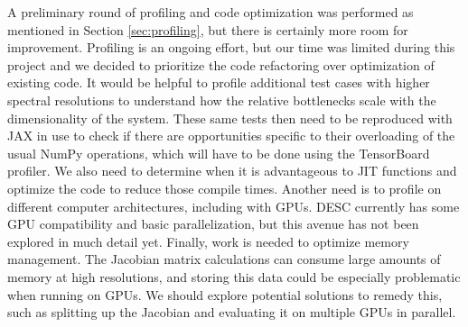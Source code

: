 \documentclass{article}
\begin{document}
A preliminary round of profiling and code optimization was performed as mentioned in Section \ref{sec:profiling}, but there is certainly more room for improvement.
Profiling is an ongoing effort, but our time was limited during this project and we decided to prioritize the code refactoring over optimization of existing code.
It would be helpful to profile additional test cases with higher spectral resolutions to understand how the relative bottlenecks scale with the dimensionality of the system.
These same tests then need to be reproduced with JAX in use to check if there are opportunities specific to their overloading of the usual NumPy operations, which will have to be done using the TensorBoard profiler.
We also need to determine when it is advantageous to JIT functions and optimize the code to reduce those compile times.
Another need is to profile on different computer architectures, including with GPUs.
DESC currently has some GPU compatibility and basic parallelization, but this avenue has not been explored in much detail yet.
Finally, work is needed to optimize memory management.
The Jacobian matrix calculations can consume large amounts of memory at high resolutions, and storing this data could be especially problematic when running on GPUs.
We should explore potential solutions to remedy this, such as splitting up the Jacobian and evaluating it on multiple GPUs in parallel.


\end{document}

